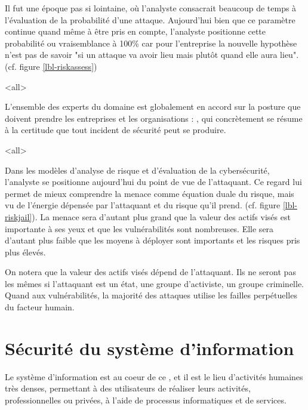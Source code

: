 
Il fut une époque pas si lointaine, où l'analyste consacrait beaucoup de temps à l'évaluation de la probabilité d'une attaque. Aujourd'hui bien que ce paramètre continue quand même à être pris en compte, l'analyste positionne cette probabilité ou vraisemblance à 100\% car pour l'entreprise la nouvelle hypothèse n'est pas de savoir "si un attaque va avoir lieu mais plutôt quand elle aura lieu". (cf. figure \ref{lbl-riskassess})



\mode<all>{}

L'ensemble des experts du domaine est globalement en accord sur la posture que doivent prendre les entreprises et les organisations : , qui concrètement se résume à la certitude que tout incident de sécurité peut se produire.

\mode<all>{}

 
Dans les modèles d'analyse de risque et d'évaluation de la cybersécurité, l'analyste se positionne aujourd'hui du point de vue de l'attaquant. Ce regard lui permet de mieux comprendre la menace comme équation duale du risque, mais vu de l'énergie dépensée par l'attaquant et du risque qu'il prend. (cf. figure \ref{lbl-riskjail}). La menace sera d'autant plus grand que la valeur des actifs visés est importante à ses yeux et que les vulnérabilités sont nombreuses. Elle sera d'autant plus faible que les moyens à déployer sont importants et les risques pris plus élevés.

On notera que la valeur des actifs visés dépend de l'attaquant. Ils ne seront pas les mêmes si l'attaquant est un état, une groupe d'activiste, un groupe criminelle.
Quand aux vulnérabilités, la majorité des attaques utilise les failles perpétuelles du facteur humain.




\section{Sécurité du système d'information}

Le système d'information est au coeur de ce , et il est le lieu d'activités humaines très denses, permettant à des utilisateurs de réaliser leurs activités, professionnelles ou privées, à l'aide de processus informatiques et de services. 

